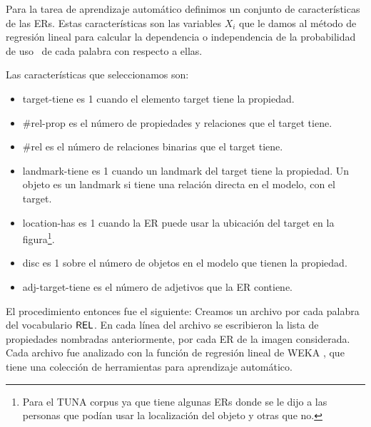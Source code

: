 Para la tarea de aprendizaje autom\'atico definimos un conjunto de caracter\'isticas de las ERs. Estas caracter\'isticas son las variables $X_i$ que le damos al m\'etodo de regresi\'on lineal para calcular la dependencia o independencia de la probabilidad de uso \puse\ de cada palabra con respecto a ellas.

Las caracter\'isticas que seleccionamos son:

\begin{itemize}
\item target-tiene es 1 cuando el elemento target tiene la propiedad. 
\item \#rel-prop es el n\'umero de propiedades y relaciones que el target tiene.
\item \#rel es el n\'umero de relaciones binarias que el target tiene. 
\item landmark-tiene es 1 cuando un landmark del target tiene la propiedad. Un objeto es un landmark si tiene una relaci\'on directa en el modelo, con el target.
\item location-has es 1 cuando la ER puede usar la ubicaci\'on del target en la figura\footnote{Para el TUNA corpus ya que tiene algunas ERs donde se le dijo a las personas que pod\'ian usar la localizaci\'on del objeto y otras que no.}.
\item disc es 1 sobre el n\'umero de objetos en el modelo que tienen la propiedad.  
\item adj-target-tiene es el n\'umero de adjetivos que la ER contiene.
\end{itemize}

El procedimiento entonces fue el siguiente:
Creamos un archivo por cada palabra del vocabulario $\textsf{REL}$. En cada l\'inea del archivo 
se escribieron la lista de propiedades nombradas anteriormente, por cada ER de la imagen considerada. Cada archivo fue analizado con la funci\'on de regresi\'on lineal de WEKA \cite{Hall:WEK09}, que tiene una colecci\'on de herramientas para aprendizaje autom\'atico.

